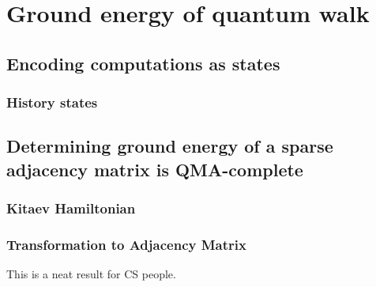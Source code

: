 \documentclass[../thesis-main/thesis-main]{subfiles}
\begin{document}
\chapter{Ground energy of quantum walk}

\section{Encoding computations as states}

\subsection{History states}

\section{Determining ground energy of a sparse adjacency matrix is QMA-complete}

\subsection{Kitaev Hamiltonian}

\subsection{Transformation to Adjacency Matrix}

This is a neat result for CS people.
\end{document}
